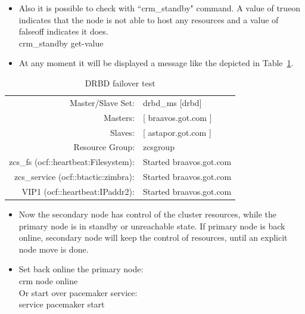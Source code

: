 \documentclass[a4paper, 12pt]{book}
\begin{document}
\begin{itemize}
	\item Also it is possible to check with ``crm\_standby" command. A value of true\textbar on indicates that the node is not able to host any resources and a value of false\textbar off indicates it does.\\
		crm\_standby \textminus \textminus get-value
\end{itemize}


\begin{itemize}
	\item At any moment it will be displayed a message like the depicted in Table~\ref{table:failover}.
\end{itemize}

\FloatBarrier
\begin{table}[H]
  \centering
  \begin{tabular}{ | r l | }
    \hline
      Master/Slave Set: 		& 	drbd\_ms [drbd]\\
      Masters: 					& [ braavos.got.com ]\\
      Slaves: 					& [ astapor.got.com ]\\
      Resource Group: 			& zcsgroup\\
      zcs\_fs (ocf::heartbeat:Filesystem): & Started braavos.got.com\\
      zcs\_service (ocf::btactic:zimbra):  & Started braavos.got.com\\
      VIP1 (ocf::heartbeat:IPaddr2):       & Started braavos.got.com\\
    \hline
  \end{tabular}
\caption{DRBD failover test}
\label{table:failover}
\end{table}

\begin{itemize}
	\item Now the secondary node has control of the cluster resources, while the primary node is in standby or unreachable state. If primary node is back online, secondary node will keep the control of resources, until an explicit node move is done.
\end{itemize}


\begin{itemize}
	\item Set back online the primary node:\\
			crm node online\\
		  Or start over pacemaker service:\\
		  	service pacemaker start
\end{itemize}
\end{document}
